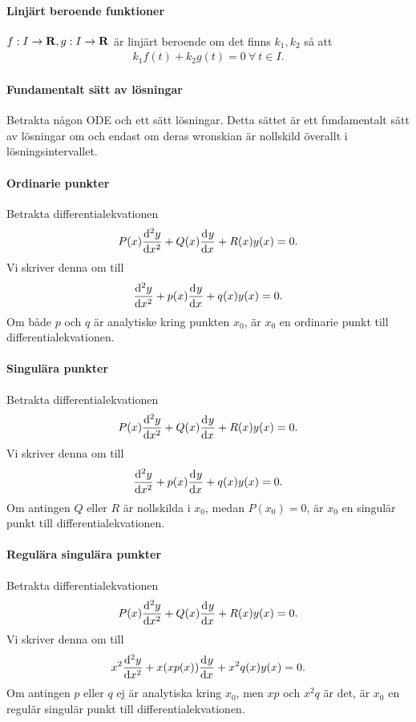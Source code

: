 \paragraph{Linjärt beroende funktioner}
$f: I\to\mathbf{R}, g: I\to\mathbf{R}$ är linjärt beroende om det finns $k_{1}, k_{2}$ så att
\begin{align*}
	k_{1}f(t) + k_{2}g(t) = 0\ \forall\ t\in I.
\end{align*}

\paragraph{Fundamentalt sätt av lösningar}
Betrakta någon ODE och ett sätt lösningar. Detta sättet är ett fundamentalt sätt av lösningar om och endast om deras wronskian är nollskild överallt i lösningsintervallet.

\paragraph{Ordinarie punkter}
Betrakta differentialekvationen
\begin{align*}
	P(x)\dv[2]{y}{x} (x) + Q(x)\dv[]{y}{x} (x) + R(x)y(x) = 0.
\end{align*}
Vi skriver denna om till
\begin{align*}
	\dv[2]{y}{x} (x) + p(x)\dv[]{y}{x} (x) + q(x)y(x) = 0.
\end{align*}
Om både $p$ och $q$ är analytiske kring punkten $x_{0}$, är $x_{0}$ en ordinarie punkt till differentialekvationen.

\paragraph{Singulära punkter}
Betrakta differentialekvationen
\begin{align*}
	P(x)\dv[2]{y}{x} (x) + Q(x)\dv[]{y}{x} (x) + R(x)y(x) = 0.
\end{align*}
Vi skriver denna om till
\begin{align*}
	\dv[2]{y}{x} (x) + p(x)\dv[]{y}{x} (x) + q(x)y(x) = 0.
\end{align*}
Om antingen $Q$ eller $R$ är nollskilda i $x_{0}$, medan $P(x_{0}) = 0$, är $x_{0}$ en singulär punkt till differentialekvationen.

\paragraph{Regulära singulära punkter}
Betrakta differentialekvationen
\begin{align*}
	P(x)\dv[2]{y}{x} (x) + Q(x)\dv[]{y}{x} (x) + R(x)y(x) = 0.
\end{align*}
Vi skriver denna om till
\begin{align*}
	x^{2}\dv[2]{y}{x} (x) + x(xp(x))\dv[]{y}{x} (x) + x^{2}q(x)y(x) = 0.
\end{align*}
Om antingen $p$ eller $q$ ej är analytiska kring $x_{0}$, men $xp$ och $x^{2}q$ är det, är $x_{0}$ en regulär singulär punkt till differentialekvationen.

